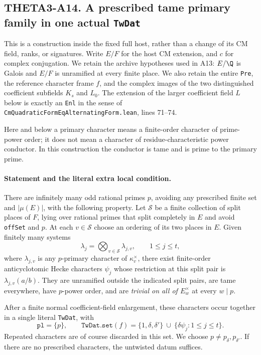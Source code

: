 \subsection{THETA3-A14. A prescribed tame primary family in one actual \texttt{TwDat}}
\label{A14}

This is a construction inside the fixed full host, rather than a change
of its CM field, ranks, or signatures.  Write $E/F$ for the host CM
extension, and $c$ for complex conjugation.  We retain the archive
hypotheses used in A13: $E/\Q$ is Galois and $E/F$ is unramified at every
finite place.  We also retain the entire \texttt{Pre}, the reference
character frame $f$, and the complex images of the two distinguished
coefficient subfields $K_s$ and $L_0$.  The extension of the larger
coefficient field $L$ below is exactly an \texttt{Enl} in the sense of
\texttt{CmQuadraticFormEqAlternatingForm.lean}, lines 71--74.

Here and below a primary character means a finite-order character of
prime-power order; it does not mean a character of residue-characteristic
power conductor.  In this construction the conductor is tame and is
prime to the primary prime.

\paragraph{Statement and the literal extra local condition.}
There are infinitely many odd rational primes $p$, avoiding any
prescribed finite set and $|\mu(E)|$, with the following property.
Let $\mathcal S$ be a finite collection of split places of $F$, lying
over rational primes that split completely in $E$ and avoid
\texttt{offSet} and $p$.  At each $v\in\mathcal S$ choose an ordering of
its two places in $E$.  Given finitely many systems
\[
 \lambda_j=\bigotimes_{v\in\mathcal S}\lambda_{j,v},
 \qquad 1\leq j\leq t,
 \tag{A14a}
\]
where $\lambda_{j,v}$ is any $p$-primary character of
$\kappa_v^\times$, there exist finite-order anticyclotomic Hecke
characters $\psi_j$ whose restriction at this split pair is
$\lambda_{j,v}(a/b)$.  They are unramified outside the indicated split
pairs, are tame everywhere, have $p$-power order, and are
\emph{trivial on all of $E_w^\times$} at every $w\mid p$.

After a finite normal coefficient-field enlargement, these characters
occur together in a single literal \texttt{TwDat}, with
\[
 \texttt{pl}=\{p\},\qquad
 \texttt{TwDat.set}(f)=
 \{1,\delta,\delta'\}\ \cup\ \{\delta\psi_j:1\leq j\leq t\}.
 \tag{A14b}
\]
Repeated characters are of course discarded in this set.  We choose
$p\ne p_{\delta},p_{\delta'}$.  If there are no prescribed characters,
the untwisted datum suffices.

